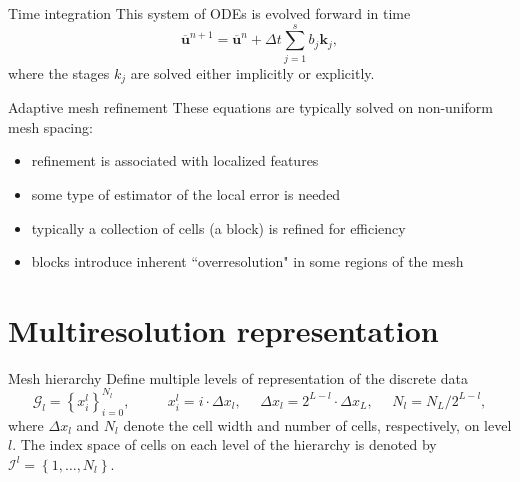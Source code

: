 \documentclass{beamer}
\begin{document}
\begin{frame}{Time integration}
    This system of ODEs is evolved forward in time
    \begin{equation}
        \overline{\bm{u}}^{n+1} = \overline{\bm{u}}^{n} + \Delta t \sum_{j=1}^{s} b_{j}
        \bm{k}_{j},
    \end{equation}
    where the stages $k_{j}$ are solved either implicitly or explicitly.
\end{frame}

\begin{frame}{Adaptive mesh refinement}
    These equations are typically solved on non-uniform mesh spacing:
    \begin{itemize}
        \item<2-> refinement is associated with localized features
        \item<3-> some type of estimator of the local error is needed
        \item<4-> typically a collection of cells (a block) is refined for efficiency
        \item<5-> blocks introduce inherent ``overresolution" in some regions of the mesh
    \end{itemize}
\end{frame}


\section{Multiresolution representation}

\begin{frame}{Mesh hierarchy}
    Define multiple levels of representation of the discrete data
    \begin{equation*}
        \bm{\mathcal{G}}_{l} = \left\{ x_{i}^{l} \right\}_{i=0}^{N_{l}}, \text{ }
        \text{ } \text{ } \text{ } x_{i}^{l} = i \cdot \Delta x_{l}, \text{ }
        \text{ } \Delta x_{l} = 2^{L-l} \cdot \Delta x_{L}, \text{ } \text{ } N_{l} = N_{L}
        / 2^{L-l},
    \end{equation*}
    where $\Delta x_{l}$ and $N_{l}$ denote the cell width and number of cells,
    respectively, on level $l$.
    The index space of cells on each level of the hierarchy is denoted by
    $\bm{\mathcal{I}}^{l} = \left\{ 1,\dots,N_{l} \right\}$.
\end{frame}
\end{document}
